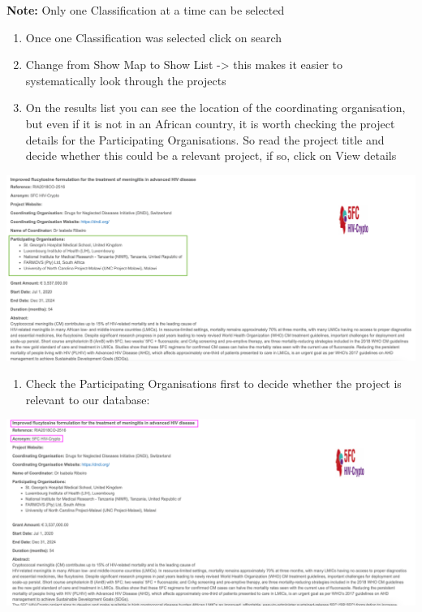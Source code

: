 \documentclass[
]{book}
\providecommand{\tightlist}{%
  \setlength{\itemsep}{0pt}\setlength{\parskip}{0pt}}
\begin{document}
\textbf{Note:} Only one Classification at a time can be selected

\begin{enumerate}
\def\labelenumi{\arabic{enumi}.}
\setcounter{enumi}{2}
\item
  Once one Classification was selected click on search
\item
  Change from Show Map to Show List -\textgreater{} this makes it easier to systematically look through the projects
\item
  On the results list you can see the location of the coordinating organisation, but even if it is not in an African country, it is worth checking the project details for the Participating Organisations. So read the project title and decide whether this could be a relevant project, if so, click on View details
\end{enumerate}

\includegraphics{images/edctp1.png}

\begin{enumerate}
\def\labelenumi{\arabic{enumi}.}
\setcounter{enumi}{5}
\tightlist
\item
  Check the Participating Organisations first to decide whether the project is relevant to our database:
\end{enumerate}

\includegraphics{images/edctp2.png}
\end{document}
